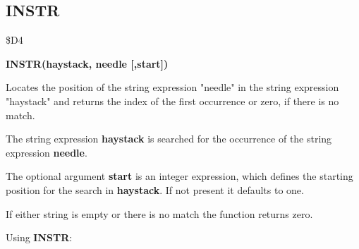 \subsection{INSTR}
\begin{description}[leftmargin=3cm,style=nextline]
\item [Token:] \$D4
\item [Format:] {\bf INSTR(haystack, needle [,start])}
\item [Usage:] Locates the
               position of the string expression "needle"
               in the string expression "haystack" and
               returns the index of the first occurrence
               or zero, if there is no match.

               The string expression {\bf haystack}
               is searched for the occurrence of the
               string expression
               {\bf needle}.

               The optional argument {\bf start} is an integer
               expression, which defines the starting position
               for the search in {\bf haystack}. If not present
               it defaults to one.

\item [Remarks:] If either string is empty or there is no match
               the function returns zero.

\item [Example:] Using {\bf INSTR}:
\end{description}


\newpage
